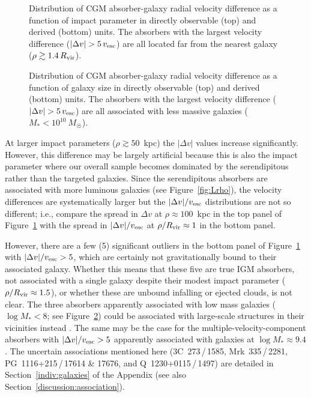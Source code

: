 \documentclass[twocolumn,twocolappendix,tighten,times]{aastex6}
\begin{document}
\begin{figure}[!t]
\caption{Distribution of CGM absorber-galaxy radial velocity difference as a function of impact parameter in directly observable (top) and derived (bottom) units. The absorbers with the largest velocity difference ($|\Delta v| > 5\,v_{\rm esc}$) are all located far from the nearest galaxy ($\rho \gtrsim 1.4\,R_{\rm vir}$).
\label{fig:veldist}}
\end{figure}


\begin{figure}[!t]
\caption{Distribution of CGM absorber-galaxy radial velocity difference as a function of galaxy size in directly observable (top) and derived (bottom) units. The absorbers with the largest velocity difference ($|\Delta v| > 5\,v_{\rm esc}$) are all associated with less massive galaxies ($M_* < 10^{10}~M_{\Sun}$).
\label{fig:velsize}}
\end{figure}


At larger impact parameters ($\rho \gtrsim 50$~kpc) the $|\Delta v|$ values 
increase significantly. However, this difference may be largely artificial 
because this is also the impact parameter where our overall sample becomes 
dominated by the serendipitous rather than the targeted galaxies. Since the 
serendipitous absorbers are associated with more luminous galaxies (see 
Figure~\ref{fig:Lrho}), the velocity differences are systematically larger
but the $|\Delta v|/v_{\rm esc}$ distributions are not so different; i.e., 
compare the spread in $\Delta v$ at $\rho \approx 100$~kpc in the top panel 
of Figure~\ref{fig:veldist} with the spread in $|\Delta v|/v_{\rm esc}$ at
$\rho/R_{\rm vir} \approx 1$ in the bottom panel.

However, there are a few (5) significant outliers in the bottom panel of 
Figure~\ref{fig:veldist} with $|\Delta v|/v_{\rm esc} > 5$, which are 
certainly not gravitationally bound to their associated galaxy. Whether 
this means that these five are true IGM absorbers, not associated with a single 
galaxy despite their modest impact parameter ($\rho/R_{\rm vir} \approx 1.5$),
or whether these are unbound infalling or ejected clouds, is not clear. 
The three absorbers apparently associated with low mass galaxies 
($\log{M_*}<8$; see Figure~\ref{fig:velsize}) could be associated 
with large-scale structures in their vicinities instead
\citep{rosenberg03,yoon12,keeney14,stocke14}. The same may be the 
case for the multiple-velocity-component absorbers with 
$|\Delta v|/v_{\rm esc} > 5$ apparently associated with galaxies at 
$\log{M_*} \approx 9.4$. The uncertain associations mentioned here
(3C~273\,/\,1585, Mrk~335\,/\,2281, PG~1116+215\,/\,17614 \& 17676, and
Q~1230+0115\,/\,1497) are detailed in Section~\ref{indiv:galaxies} 
of the Appendix (see also Section~\ref{discussion:association}).
\end{document}
